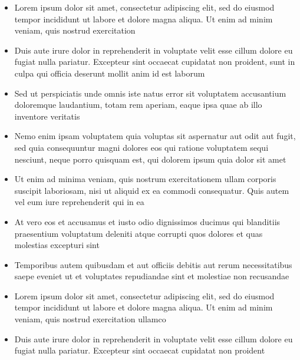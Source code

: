 \documentclass[10pt,a4paper,withhyper,ragged2e]{altacv}
\begin{document}
\begin{itemize}
  \item Lorem ipsum dolor sit amet, consectetur adipiscing elit, sed do eiusmod tempor incididunt
        ut labore et dolore magna aliqua. Ut enim ad minim veniam, quis nostrud exercitation
  \item Duis aute irure dolor in reprehenderit in voluptate velit esse cillum dolore eu fugiat
        nulla pariatur. Excepteur sint occaecat cupidatat non proident, sunt in culpa qui officia
        deserunt mollit anim id est laborum
  \item Sed ut perspiciatis unde omnis iste natus error sit voluptatem accusantium doloremque
        laudantium, totam rem aperiam, eaque ipsa quae ab illo inventore veritatis
  \item Nemo enim ipsam voluptatem quia voluptas sit aspernatur aut odit aut fugit, sed quia
        consequuntur magni dolores eos qui ratione voluptatem sequi nesciunt, neque porro quisquam
        est, qui dolorem ipsum quia dolor sit amet
  \item Ut enim ad minima veniam, quis nostrum exercitationem ullam corporis suscipit laboriosam,
        nisi ut aliquid ex ea commodi consequatur. Quis autem vel eum iure reprehenderit qui in ea
  \item At vero eos et accusamus et iusto odio dignissimos ducimus qui blanditiis praesentium
        voluptatum deleniti atque corrupti quos dolores et quas molestias excepturi sint
  \item Temporibus autem quibusdam et aut officiis debitis aut rerum necessitatibus saepe eveniet
        ut et voluptates repudiandae sint et molestiae non recusandae
\end{itemize}

\begin{itemize}
  \item Lorem ipsum dolor sit amet, consectetur adipiscing elit, sed do eiusmod tempor incididunt
        ut labore et dolore magna aliqua. Ut enim ad minim veniam, quis nostrud exercitation
        ullamco
  \item Duis aute irure dolor in reprehenderit in voluptate velit esse cillum dolore eu fugiat
        nulla pariatur. Excepteur sint occaecat cupidatat non proident
\end{itemize}
\end{document}
